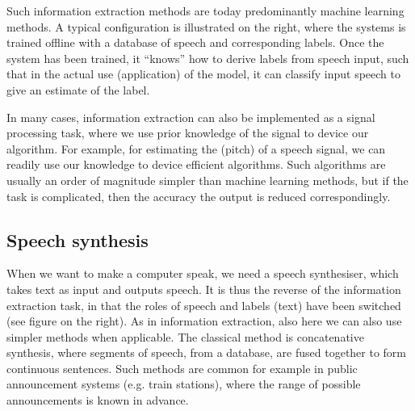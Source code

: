 \documentclass[letterpaper,10pt,english]{jupyterBook}
\begin{document}
\sphinxAtStartPar
Such information extraction methods are today predominantly machine
learning methods. A typical configuration is illustrated on the right,
where the systems is trained off\sphinxhyphen{}line with a database of speech and
corresponding labels. Once the system has been trained, it “knows” how
to derive labels from speech input, such that in the actual use
(application) of the model, it can classify input speech to give an
estimate of the label.

\sphinxAtStartPar
In many cases, information extraction can also be implemented as a
signal processing task, where we use prior knowledge of the signal to
device our algorithm. For example, for estimating the  (pitch) of a speech signal, we can
readily use our knowledge to device efficient algorithms. Such
algorithms are usually an order of magnitude simpler than machine
learning methods, but if the task is complicated, then the accuracy the
output is reduced correspondingly.

\sphinxAtStartPar
{}


\subsection{Speech synthesis}
\label{\detokenize{Introduction/Applications_and_systems_structures:speech-synthesis}}
\sphinxAtStartPar
When we want to make a computer speak, we need a speech synthesiser,
which takes text as input and outputs speech. It is thus the reverse of
the information extraction \sphinxhyphen{}task, in that the roles of speech and labels
(text) have been switched (see figure on the right). As in information
extraction, also here we can also use simpler methods when applicable.
The classical method is concatenative synthesis, where segments of
speech, from a database, are fused together to form continuous
sentences. Such methods are common for example in public announcement
systems (e.g. train stations), where the range of possible announcements
is known in advance.

\sphinxAtStartPar
{}
\end{document}
